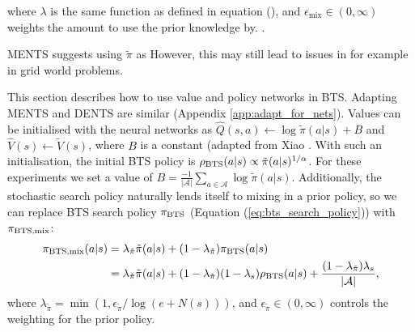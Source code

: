         where $\lambda$ is the same function as defined in equation (), and $\epsilon_{\text{mix}}\in(0,\infty)$ weights the amount to use the prior knowledge by. .



        

         MENTS suggests using $\tilde{\pi}$ as 
        However, this may still lead to issues in for example in grid world problems. 




        This section describes how to use value and policy networks in BTS. Adapting MENTS and DENTS are similar (Appendix \ref{app:adapt_for_nets}). Values can be initialised with the neural networks as $\hat{Q}(s,a)\leftarrow\log \tilde{\pi}(a|s)+B$ and $\hat{V}(s)\leftarrow\tilde{V}(s)$, where $B$ is a constant (adapted from Xiao \etal {}%
        . With such an initialisation, the initial BTS policy is 
        $\rho_{\textnormal{BTS}}(a|s)\propto\tilde{\pi}(a|s)^{1/\alpha}$. For these experiments we set a value of $B=\frac{-1}{|\mathcal{A}|}\sum_{a\in\mathcal{A}} \log\tilde{\pi}(a|s)$. Additionally, the stochastic search policy naturally lends itself to mixing in a prior policy, so we can replace BTS search policy $\pi_{\textnormal{BTS}}$ (Equation (\ref{eq:bts_search_policy})) with $\pi_{\textnormal{BTS,mix}}$:
        \begin{align}
            \pi_{\textnormal{BTS,mix}}(a|s) 
            &= \lambda_{\tilde{\pi}}\tilde{\pi}(a|s) + (1-\lambda_{\tilde{\pi}}) \pi_{\textnormal{BTS}}(a|s) \\
            &= \lambda_{\tilde{\pi}}\tilde{\pi}(a|s) + (1-\lambda_{\tilde{\pi}})(1-\lambda_s)\rho_{\textnormal{BTS}}(a|s) + \frac{(1-\lambda_{\tilde{\pi}})\lambda_s}{|\cl{A}|}, %
        \end{align}
        where $\lambda_{\tilde{\pi}}=\min(1,\epsilon_{\tilde{\pi}}/\log(e+N(s)))$, and $\epsilon_{\tilde{\pi}} \in (0,\infty)$ controls the weighting for the prior policy.









